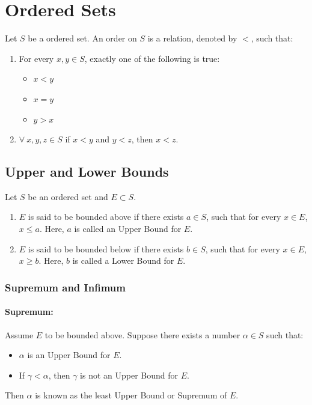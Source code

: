 \documentclass[12pt, oneside]{book}
\theoremstyle{definition}
\begin{document}
\section{Ordered Sets}
Let \(S\) be a ordered set.
An order on \(S\) is a relation, denoted by \(<\), such that:
\begin{enumerate}
	\item For every \(x,y \in S\), exactly one of the following is true:
	      \begin{itemize}
		      \item \(x < y\)
		      \item \(x = y\)
		      \item \(y > x\)
	      \end{itemize}
	\item \(\forall \: x,y,z \in S\) if \(x < y\) and \(y < z\), then \(x < z\).
\end{enumerate}

\subsection{Upper and Lower Bounds}
Let \(S\) be an ordered set and \(E \subset S\).
\begin{enumerate}
	\item \(E\) is said to be bounded above if there exists \( a \in S \), such that for every \( x \in E \), \( x \leq a \). Here, \(a\) is called an Upper Bound for \(E\).
	\item \(E\) is said to be bounded below if there exists \( b \in S \), such that for every \( x \in E \), \( x \geq b \). Here, \(b\) is called a Lower Bound for \(E\).
\end{enumerate}

\subsubsection{Supremum and Infimum}
\paragraph{Supremum:} Assume \(E\) to be bounded above.
Suppose there exists a number \(\alpha \in S\) such that:
\begin{itemize}
	\item \(\alpha\) is an Upper Bound for \(E\).
	\item If \(\gamma < \alpha\), then \(\gamma\) is not an Upper Bound for \(E\).
\end{itemize}
Then \( \alpha \) is known as the least Upper Bound or Supremum of \(E\).
\end{document}
